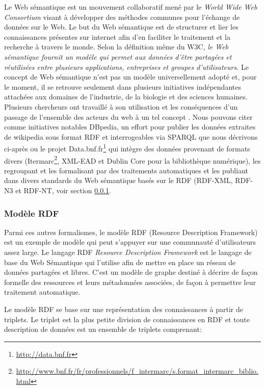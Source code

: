 Le Web sémantique est un mouvement collaboratif mené par le \textit{World Wide Web Consortium} visant à développer des méthodes communes pour l'échange de données sur le Web. Le but du Web sémantique est de structurer et lier les connaissances présentes sur internet afin d'en faciliter le traitement et la recherche à travers le monde. Selon la définition même du W3C, \textit{le Web sémantique fournit un modèle qui permet aux données d'être partagées et réutilisées entre plusieurs applications, entreprises et groupes d'utilisateurs.} Le concept de Web sémantique n'est pas un modèle universellement adopté et, pour le moment, il se retrouve seulement dans plusieurs initiatives indépendantes attachées aux domaines de l'industrie, de la biologie et des sciences humaines. Plusieurs chercheurs ont travaillé à son utilisation et les conséquences d'un passage de l'ensemble des acteurs du web à un tel concept \cite{feigenbaum_semantic_2007}. Nous pouvons citer comme initiatives notables DBpedia, un effort pour publier les données extraites de wikipedia sous format RDF et interrogeables via SPARQL que nous décrivons ci-après \cite{auer2007dbpedia} ou le projet Data.bnf.fr\footnote{\url{http://data.bnf.fr}} qui intègre des données provenant de formats divers (Itermarc\footnote{\url{http://www.bnf.fr/fr/professionnels/f_intermarc/s.format_intermarc_biblio.html}}, XML-EAD et Dublin Core \cite{weibel1998dublin} pour la bibliothèque numérique), les regroupant et les formalisant par des traitements automatiques et les publiant dans divers standards du Web sémantique basés sur le RDF (RDF-XML, RDF-N3 et RDF-NT, voir section \ref{}.

\subsubsection{Modèle RDF}

Parmi ces autres formalismes, le modèle RDF (Resource Description Framework) est un exemple de modèle qui peut s'appuyer sur une communauté d'utilisateurs assez large.
Le langage RDF \textit{Resource Description Framework} est le langage de base du Web Sémantique qui l'utilise afin de mettre en place un réseau de données partagées et libres. C'est un modèle de graphe destiné à décrire de façon formelle des ressources et leurs métadonnées associées, de façon à permettre leur traitement automatique.

Le modèle RDF se base sur une représentation des connaissances à partir de triplets. Le triplet est la plus petite division de connaissances en RDF et toute description de données est un ensemble de triplets comprenant:

